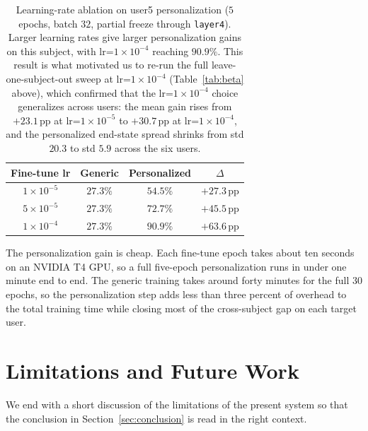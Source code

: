\documentclass[12pt,a4paper]{article}
\begin{document}
\begin{table}[H]
  \centering
  \footnotesize
  \begin{tabular}{cccc}
    \toprule
    Fine-tune lr & Generic & Personalized & $\Delta$ \\
    \midrule
    $1\times 10^{-5}$ & $27.3\%$ & $54.5\%$           & $+27.3$\,pp \\
    $5\times 10^{-5}$ & $27.3\%$ & $72.7\%$           & $+45.5$\,pp \\
    $1\times 10^{-4}$ & $27.3\%$ & $\mathbf{90.9\%}$  & $\mathbf{+63.6}$\,pp \\
    \bottomrule
  \end{tabular}
  \caption{\footnotesize Learning-rate ablation on user5 personalization
  ($5$ epochs, batch $32$, partial freeze through
  \texttt{layer4}). Larger learning rates give larger
  personalization gains on this subject, with
  lr=$1\times 10^{-4}$ reaching $90.9\%$. This result is what
  motivated us to re-run the full leave-one-subject-out sweep
  at lr=$1\times 10^{-4}$ (Table~\ref{tab:beta} above), which
  confirmed that the lr=$1\times 10^{-4}$ choice generalizes
  across users: the mean gain rises from $+23.1$\,pp at
  lr=$1\times 10^{-5}$ to $+30.7$\,pp at lr=$1\times 10^{-4}$,
  and the personalized end-state spread shrinks from std
  $20.3$ to std $5.9$ across the six users.}
  \label{tab:ftlr}
\end{table}

The personalization gain is cheap. Each fine-tune epoch takes
about ten seconds on an NVIDIA T4 GPU, so a full five-epoch
personalization runs in under one minute end to end. The
generic training takes around forty minutes for the full $30$
epochs, so the personalization step adds less than three
percent of overhead to the total training time while closing
most of the cross-subject gap on each target user.

\section{Limitations and Future Work}
\label{sec:limits}

We end with a short discussion of the limitations of the
present system so that the conclusion in
Section~\ref{sec:conclusion} is read in the right context.
\end{document}
